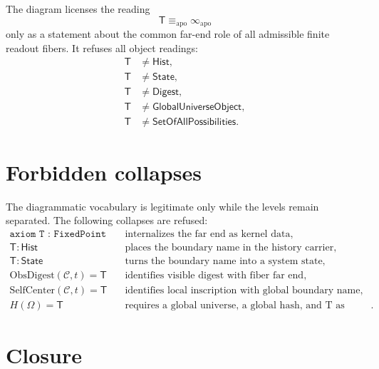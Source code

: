 \begin{principle}
\label{prin:far-end-apophatic-infinity-not-totality}
The diagram licenses the reading
$$
\mathsf{T} \equiv_{\mathrm{apo}} \infty_{\mathrm{apo}}
$$
only as a statement about the common far-end role of all admissible finite
readout fibers. It refuses all object readings:
$$
\begin{aligned}
\mathsf{T} &\neq \mathsf{Hist},\\
\mathsf{T} &\neq \mathsf{State},\\
\mathsf{T} &\neq \mathsf{Digest},\\
\mathsf{T} &\neq \mathsf{GlobalUniverseObject},\\
\mathsf{T} &\neq \mathsf{SetOfAllPossibilities}.
\end{aligned}
$$
\end{principle}

\section{Forbidden collapses}
\label{sec:far-end-diagrammatics-forbidden-collapses}

The diagrammatic vocabulary is legitimate only while the levels remain
separated. The following collapses are refused:
$$
\begin{aligned}
\texttt{axiom T : FixedPoint}
&\quad \text{internalizes the far end as kernel data},\\
\mathsf{T}:\mathsf{Hist}
&\quad \text{places the boundary name in the history carrier},\\
\mathsf{T}:\mathsf{State}
&\quad \text{turns the boundary name into a system state},\\
\mathrm{ObsDigest}(\mathcal{C},t)=\mathsf{T}
&\quad \text{identifies visible digest with fiber far end},\\
\mathrm{SelfCenter}(\mathcal{C},t)=\mathsf{T}
&\quad \text{identifies local inscription with global boundary name},\\
H(\Omega)=\mathsf{T}
&\quad \text{requires a global universe, a global hash, and T as value}.
\end{aligned}
$$

\section{Closure}
\label{sec:far-end-diagrammatics-closure}

